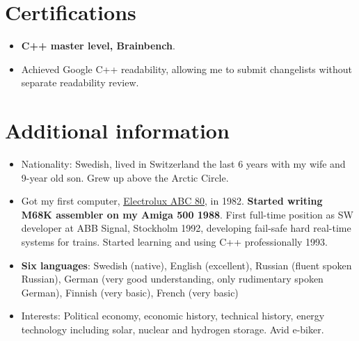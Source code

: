 \documentclass[a4paper,11pt]{article}
\newcommand{\resumeItem}[1]{
  \item\small{#1}
}
\newcommand{\resumeItemListStart}{\begin{itemize}[rightmargin=0.11in]}
\newcommand{\resumeItemListEnd}{\end{itemize}}
\begin{document}

\section{Certifications}
\resumeItemListStart{}


  \resumeItem{\textbf{C++ master level, Brainbench}.}

  \resumeItem{Achieved Google C++ readability, allowing me to submit
    changelists without separate readability review.}

  \resumeItemListEnd{}

\section{Additional information}
\resumeItemListStart{}

    \resumeItem{Nationality: Swedish, lived in Switzerland the last 6 years
      with my wife and 9-year old son. Grew up above the Arctic Circle.}

    \resumeItem{Got my first computer,
      \href{https://en.wikipedia.org/wiki/ABC_80}{\uline{Electrolux ABC 80}},
      in 1982. \textbf{Started writing M68K assembler on my Amiga 500
        1988}. First full-time position as SW developer at ABB Signal,
      Stockholm 1992, developing fail-safe hard real-time systems for
      trains. Started learning and using C++ professionally 1993.}

    \resumeItem{\textbf{Six languages}: Swedish (native), English (excellent),
      Russian (fluent spoken Russian), German (very good understanding, only
      rudimentary spoken German), Finnish (very basic), French (very basic)}

    \resumeItem{Interests: Political economy, economic history, technical
      history, energy technology including solar, nuclear and hydrogen
      storage. Avid e-biker.}  \resumeItemListEnd{}

\end{document}

